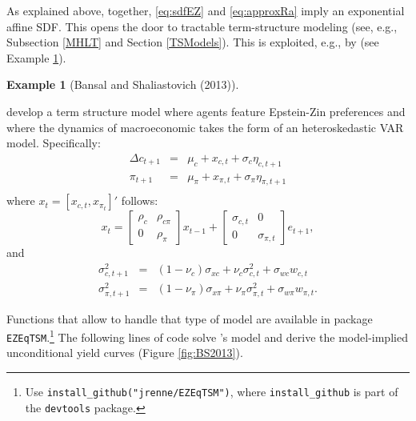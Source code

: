 \documentclass[
  12pt,
]{book}
\theoremstyle{definition}
\theoremstyle{definition}
\newtheorem{example}{Example}[chapter]
\theoremstyle{definition}
\theoremstyle{definition}
\theoremstyle{remark}
\begin{document}
As explained above, together, \eqref{eq:sdfEZ} and \eqref{eq:approxRa} imply an exponential affine SDF. This opens the door to tractable term-structure modeling (see, e.g., Subsection \ref{MHLT} and Section \ref{TSModels}). This is exploited, e.g., by \citet{Bansal_Shaliastovich_2013} (see Example \ref{exm:BS2013}).

\begin{example}[Bansal and Shaliastovich (2013)]
\protect\hypertarget{exm:BS2013}{}\label{exm:BS2013}

\citet{Bansal_Shaliastovich_2013} develop a term structure model where agents feature Epstein-Zin preferences and where the dynamics of macroeconomic takes the form of an heteroskedastic VAR model. Specifically:
\begin{eqnarray*}
\Delta c_{t+1} &=& \mu_c + x_{c,t} + \sigma_c \eta_{c,t+1}\\
\pi_{t+1} &=& \mu_\pi + x_{\pi,t} + \sigma_\pi \eta_{\pi,t+1}\\
\end{eqnarray*}
where \(x_t = [x_{c,t},x_{\pi_t}]'\) follows:
\[
x_t = \left[\begin{array}{cc}\rho_c & \rho_{c \pi}\\0&\rho_\pi\end{array}\right] x_{t-1} + \left[\begin{array}{cc}\sigma_{c,t} & 0\\0&\sigma_{\pi,t}\end{array}\right] e_{t+1},
\]
and
\begin{eqnarray}
\sigma_{c,t+1}^2 &=& (1-\nu_c)\sigma_{xc} + \nu_c\sigma_{c,t}^2  + \sigma_{wc}w_{c,t}\\ \sigma_{\pi,t+1}^2 &=& (1-\nu_\pi)\sigma_{x\pi} + \nu_\pi\sigma_{\pi,t}^2  + \sigma_{w\pi}w_{\pi,t}.
\end{eqnarray}

Functions that allow to handle that type of model are available in package \texttt{EZEqTSM}.\footnote{Use \texttt{install\_github("jrenne/EZEqTSM")}, where \texttt{install\_github} is part of the \texttt{devtools} package.} The following lines of code solve \citet{Bansal_Shaliastovich_2013}'s model and derive the model-implied unconditional yield curves (Figure \ref{fig:BS2013}).


\end{example}
\end{document}
